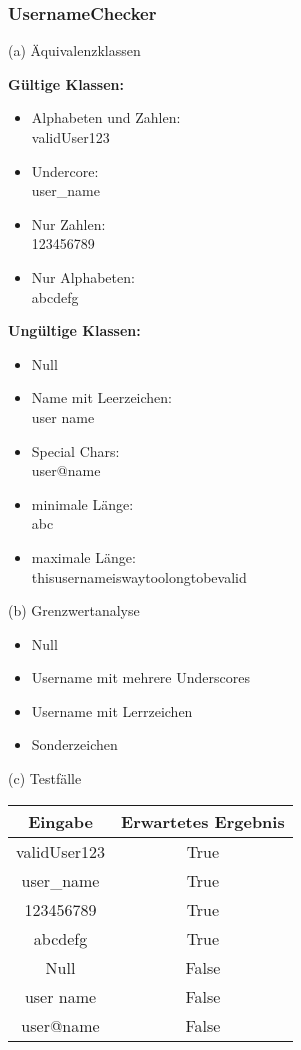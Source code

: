 \subsubsection*{UsernameChecker}
(a) Äquivalenzklassen\\
\begin{minipage}[t]{0.48\textwidth}
\textbf{Gültige Klassen:}
\begin{itemize}
    \item Alphabeten und Zahlen: \\ validUser123
    \item Undercore: \\ user\_name
    \item Nur Zahlen: \\ 123456789
    \item Nur Alphabeten: \\ abcdefg
\end{itemize}
\end{minipage}
\hfill
\begin{minipage}[t]{0.48\textwidth}
\textbf{Ungültige Klassen:}
\begin{itemize}
    \item Null
    \item Name mit Leerzeichen: \\ user name
    \item Special Chars: \\ user@name
    \item minimale Länge: \\ abc
    \item maximale Länge: \\ thisusernameiswaytoolongtobevalid
\end{itemize}
\end{minipage}

\vspace{1em}

(b) Grenzwertanalyse
\begin{itemize}
    \item Null
    \item Username mit mehrere Underscores
    \item Username mit Lerrzeichen
    \item Sonderzeichen 
\end{itemize}

(c) Testfälle \\
\begin{tabular}{ c | c }
 Eingabe & Erwartetes Ergebnis \\
 \hline
 validUser123 & True  \\
 user\_name & True \\
 123456789 & True \\
 abcdefg & True \\
 \hline
 Null & False  \\  
 user name & False \\
 user@name & False \\
\end{tabular}